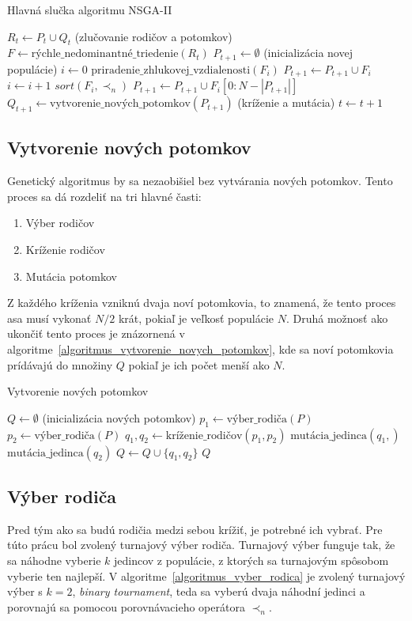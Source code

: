 \vspace*{\dimexpr0.5\baselineskip\relax}
\begin{algorithm}[h]\label{algoritmus_nsga2}
\caption{Hlavná slučka algoritmu NSGA-II}
  $R_t \gets P_t \cup Q_t$ (zlučovanie rodičov a potomkov)\;
  $F \gets \text{rýchle\_nedominantné\_triedenie}(R_t)$\;
  $P_{t+1} \gets \emptyset$ (inicializácia novej populácie)\;
  $i \gets 0$\;
   {
    $\text{priradenie\_zhlukovej\_vzdialenosti}(F_i)$\;
    $P_{t+1} \gets P_{t+1} \cup F_i$\;
    $i \gets i + 1$\;
  }
  $sort(F_i, \prec_n)$\;
  $P_{t+1} \gets P_{t+1} \cup F_i[0:N - |P_{t+1}|]$\;
  $Q_{t+1} \gets \text{vytvorenie\_nových\_potomkov}(P_{t+1})$ (kríženie a mutácia)\;
  $t \gets t + 1$\;
\end{algorithm}

\subsection*{Vytvorenie nových potomkov}
Genetický algoritmus by sa nezaobišiel bez vytvárania nových potomkov.
Tento proces sa dá rozdeliť na tri hlavné časti:
\begin{enumerate}
  \item Výber rodičov
  \item Kríženie rodičov
  \item Mutácia potomkov
\end{enumerate}
Z každého kríženia vzniknú dvaja noví potomkovia, to znamená, že tento proces asa musí vykonať $N/2$ krát, pokiaľ je veľkosť populácie $N$.
Druhá možnosť ako ukončiť tento proces je znázornená v algoritme~\ref{algoritmus_vytvorenie_novych_potomkov}, kde sa noví potomkovia prídávajú do množiny $Q$ pokiaľ je ich počet menší ako $N$.

\vspace*{\dimexpr0.5\baselineskip\relax}
\begin{algorithm}[h]\label{algoritmus_vytvorenie_novych_potomkov}
\caption{Vytvorenie nových potomkov}
  $Q \gets \emptyset$ (inicializácia nových potomkov)\;
   {
    $p_1 \gets \text{výber\_rodiča}(P)$\;
    $p_2 \gets \text{výber\_rodiča}(P)$\;
    $q_1, q_2 \gets \text{kríženie\_rodičov}(p_1, p_2)$\;
    $\text{mutácia\_jedinca}(q_1,)$\;
    $\text{mutácia\_jedinca}(q_2)$\;
    $Q \gets Q \cup \{q_1, q_2\}$\;
  }
  \Return $Q$\;
\end{algorithm}

\subsection*{Výber rodiča}
Pred tým ako sa budú rodičia medzi sebou krížiť, je potrebné ich vybrať.
Pre túto prácu bol zvolený turnajový výber rodiča.
Turnajový výber funguje tak, že sa náhodne vyberie $k$ jedincov z populácie, z ktorých sa turnajovým spôsobom vyberie ten najlepší.
V algoritme~\ref{algoritmus_vyber_rodica} je zvolený turnajový výber s $k = 2$, \textit{binary tournament}, teda sa vyberú dvaja náhodní jedinci a porovnajú sa pomocou porovnávacieho operátora $\prec_n$.

